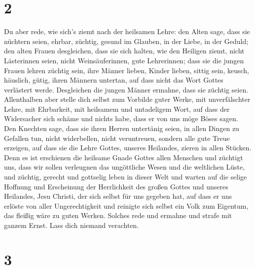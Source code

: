 \hypertarget{section-1}{%
\section{2}\label{section-1}}

 Du aber rede, wie sich's ziemt nach der heilsamen Lehre:
 den Alten sage, dass sie nüchtern seien, ehrbar, züchtig,
gesund im Glauben, in der Liebe, in der Geduld;  den alten
Frauen desgleichen, dass sie sich halten, wie den Heiligen ziemt, nicht
Lästerinnen seien, nicht Weinsäuferinnen, gute Lehrerinnen;
 dass sie die jungen Frauen lehren züchtig sein, ihre
Männer lieben, Kinder lieben,  sittig sein, keusch,
häuslich, gütig, ihren Männern untertan, auf dass nicht das Wort Gottes
verlästert werde.  Desgleichen die jungen Männer ermahne,
dass sie züchtig seien.  Allenthalben aber stelle dich
selbst zum Vorbilde guter Werke, mit unverfälschter Lehre, mit
Ehrbarkeit,  mit heilsamem und untadeligem Wort, auf dass
der Widersacher sich schäme und nichts habe, dass er von uns möge Böses
sagen.  Den Knechten sage, dass sie ihren Herren
untertänig seien, in allen Dingen zu Gefallen tun, nicht widerbellen,
 nicht veruntreuen, sondern alle gute Treue erzeigen, auf
dass sie die Lehre Gottes, unseres Heilandes, zieren in allen Stücken.
 Denn es ist erschienen die heilsame Gnade Gottes allen
Menschen  und züchtigt uns, dass wir sollen verleugnen
das ungöttliche Wesen und die weltlichen Lüste, und züchtig, gerecht und
gottselig leben in dieser Welt  und warten auf die selige
Hoffnung und Erscheinung der Herrlichkeit des großen Gottes und unseres
Heilandes, Jesu Christi,  der sich selbst für uns gegeben
hat, auf dass er uns erlöste von aller Ungerechtigkeit und reinigte sich
selbst ein Volk zum Eigentum, das fleißig wäre zu guten Werken.
 Solches rede und ermahne und strafe mit ganzem Ernst.
Lass dich niemand verachten.

\hypertarget{section-2}{%
\section{3}\label{section-2}}

